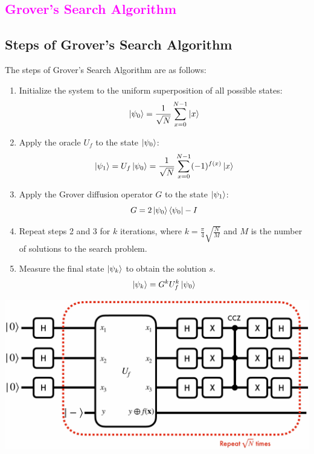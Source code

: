 \documentclass{book}
\begin{document}
\textcolor{magenta}{\section{\textbf{Grover's Search Algorithm}}}
\subsection{Steps of Grover's Search Algorithm}
The steps of Grover's Search Algorithm are as follows:
\begin{enumerate}
    \item Initialize the system to the uniform superposition of all possible states:
    \[
        \ket{\psi_0} = \frac{1}{\sqrt{N}} \sum_{x=0}^{N-1} \ket{x}
    \]
    \item Apply the oracle $U_f$ to the state $\ket{\psi_0}$:
    \[
        \ket{\psi_1} = U_f\ket{\psi_0} = \frac{1}{\sqrt{N}} \sum_{x=0}^{N-1} (-1)^{f(x)}\ket{x}
    \]
    \item Apply the Grover diffusion operator $G$ to the state $\ket{\psi_1}$:
    \[
        G = 2\ket{\psi_0}\bra{\psi_0} - I
    \]
    \item Repeat steps 2 and 3 for $k$ iterations, where $k = \frac{\pi}{4}\sqrt{\frac{N}{M}}$ and $M$ is the number of solutions to the search problem.
    \item Measure the final state $\ket{\psi_k}$ to obtain the solution $s$.
    \[
        \ket{\psi_k} = G^k U_f^k \ket{\psi_0}
    \]
\end{enumerate}
\begin{center}
    \includegraphics[scale = 0.18]{ch4/ch4_figure1.jpeg}
\end{center}
\newpage
\end{document}
